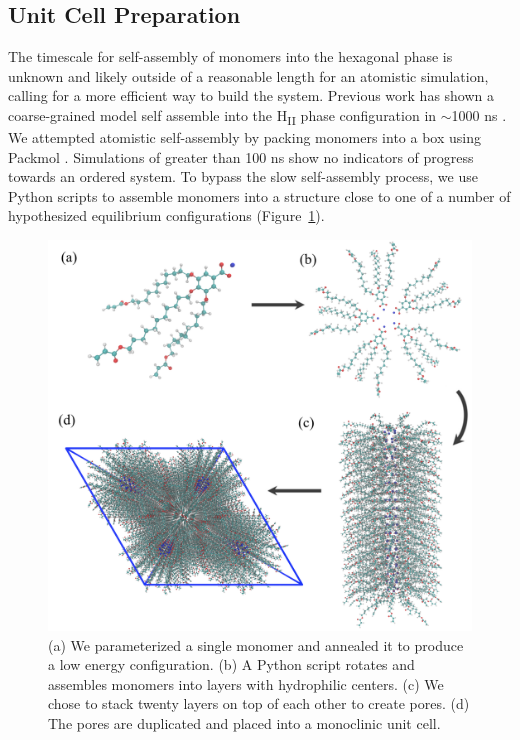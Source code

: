 \documentclass[journal=jpcbfk,manusciprt=article]{achemso}
\begin{document}
  \subsection{Unit Cell Preparation}

  The timescale for self-assembly of monomers into the hexagonal phase is
  unknown and likely outside of a reasonable length for an atomistic simulation,
  calling for a more efficient way to build the system. Previous work has shown
  a coarse-grained model self assemble into the H\textsubscript{II} phase
  configuration in $\sim$1000 ns \cite{mondal_self-assembly_2013}.  We
  attempted atomistic self-assembly by packing monomers into a box using Packmol
  \cite{martinez_packmol:_2009}. Simulations of greater than 100 ns show no
  indicators of progress towards an ordered system. To bypass the slow
  self-assembly process, we use Python scripts to assemble monomers into a
  structure close to one of a number of hypothesized equilibrium configurations
  (Figure~\ref{fig:python}).
  \begin{figure}
	\centering
	\includegraphics[width=0.75\linewidth]{build.PNG} %
	\caption{(a) We parameterized a single monomer and annealed it to produce a low energy
		configuration. (b) A Python script rotates and assembles monomers into layers with 
		hydrophilic centers. (c) We chose to stack twenty layers on top of each other to create
		pores. (d) The pores are duplicated and placed into a monoclinic unit cell.}\label{fig:python}
  \end{figure}
  
\end{document}
